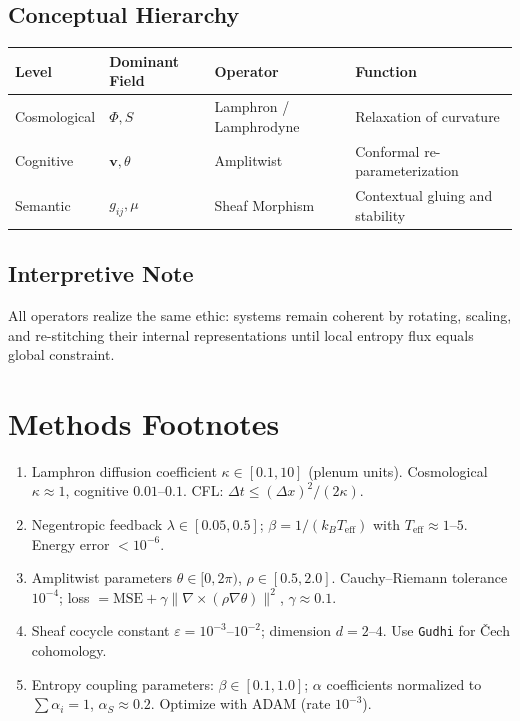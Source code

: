 \documentclass[11pt]{article}
\begin{document}
\subsection*{Conceptual Hierarchy}
\begin{center}
\begin{tabular}{llll}
\toprule
\textbf{Level} & \textbf{Dominant Field} & \textbf{Operator} & \textbf{Function} \\
\midrule
Cosmological & $\Phi, S$ & Lamphron / Lamphrodyne & Relaxation of curvature \\
Cognitive & $\mathbf{v}, \theta$ & Amplitwist & Conformal re-parameterization \\
Semantic & $g_{ij}, \mu$ & Sheaf Morphism & Contextual gluing and stability \\
\bottomrule
\end{tabular}
\end{center}

\subsection*{Interpretive Note}
All operators realize the same ethic: systems remain coherent by rotating, scaling, and re-stitching their internal representations until local entropy flux equals global constraint.

\section*{Methods Footnotes}
\begin{enumerate}
\item Lamphron diffusion coefficient $\kappa \in [0.1,10]$ (plenum units). Cosmological $\kappa \approx 1$, cognitive $0.01$--$0.1$. CFL: $\Delta t \le (\Delta x)^2/(2\kappa)$.
\item Negentropic feedback $\lambda \in [0.05,0.5]$; $\beta = 1/(k_B T_{\mathrm{eff}})$ with $T_{\mathrm{eff}} \approx 1$--$5$. Energy error $<10^{-6}$.
\item Amplitwist parameters $\theta \in [0,2\pi)$, $\rho \in [0.5,2.0]$. Cauchy--Riemann tolerance $10^{-4}$; loss $= \mathrm{MSE} + \gamma \|\nabla \times (\rho \nabla \theta)\|^2$, $\gamma \approx 0.1$.
\item Sheaf cocycle constant $\varepsilon = 10^{-3}$--$10^{-2}$; dimension $d=2$--$4$. Use \texttt{Gudhi} for \v{C}ech cohomology.
\item Entropy coupling parameters: $\beta \in [0.1,1.0]$; $\alpha$ coefficients normalized to $\sum \alpha_i = 1$, $\alpha_S \approx 0.2$. Optimize with ADAM (rate $10^{-3}$).
\end{enumerate}
\end{document}
